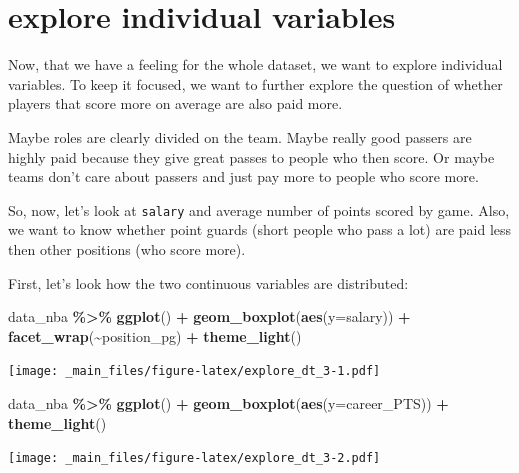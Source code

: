 \documentclass[
]{book}
\newenvironment{Shaded}{\begin{snugshade}}{\end{snugshade}}
\newcommand{\AttributeTok}[1]{\textcolor[rgb]{0.13,0.29,0.53}{#1}}
\newcommand{\FunctionTok}[1]{\textcolor[rgb]{0.13,0.29,0.53}{\textbf{#1}}}
\newcommand{\NormalTok}[1]{#1}
\newcommand{\SpecialCharTok}[1]{\textcolor[rgb]{0.81,0.36,0.00}{\textbf{#1}}}
\begin{document}
\hypertarget{explore-individual-variables}{%
\section{explore individual variables}\label{explore-individual-variables}}

Now, that we have a feeling for the whole dataset, we want to explore individual
variables. To keep it focused, we want to further explore the question
of whether players that score more on average are also paid more.

Maybe roles are clearly divided on the team. Maybe really good passers are highly
paid because they give great passes to people who then score. Or maybe teams
don't care about passers and just pay more to people who score more.

So, now, let's look at \texttt{salary} and average number of points scored by game.
Also, we want to know whether point guards (short people who pass a lot) are
paid less then other positions (who score more).

First, let's look how the two continuous variables are distributed:

\begin{Shaded}
\begin{Highlighting}[]
\NormalTok{data\_nba }\SpecialCharTok{\%\textgreater{}\%} \FunctionTok{ggplot}\NormalTok{() }\SpecialCharTok{+} 
\FunctionTok{geom\_boxplot}\NormalTok{(}\FunctionTok{aes}\NormalTok{(}\AttributeTok{y=}\NormalTok{salary)) }\SpecialCharTok{+}
  \FunctionTok{facet\_wrap}\NormalTok{(}\SpecialCharTok{\textasciitilde{}}\NormalTok{position\_pg) }\SpecialCharTok{+}
  \FunctionTok{theme\_light}\NormalTok{()}
\end{Highlighting}
\end{Shaded}

\texttt{[image: \_main\_files/figure-latex/explore\_dt\_3-1.pdf]}

\begin{Shaded}
\begin{Highlighting}[]
\NormalTok{data\_nba }\SpecialCharTok{\%\textgreater{}\%} \FunctionTok{ggplot}\NormalTok{() }\SpecialCharTok{+} 
\FunctionTok{geom\_boxplot}\NormalTok{(}\FunctionTok{aes}\NormalTok{(}\AttributeTok{y=}\NormalTok{career\_PTS)) }\SpecialCharTok{+} 
  \FunctionTok{theme\_light}\NormalTok{()}
\end{Highlighting}
\end{Shaded}

\texttt{[image: \_main\_files/figure-latex/explore\_dt\_3-2.pdf]}
\end{document}
